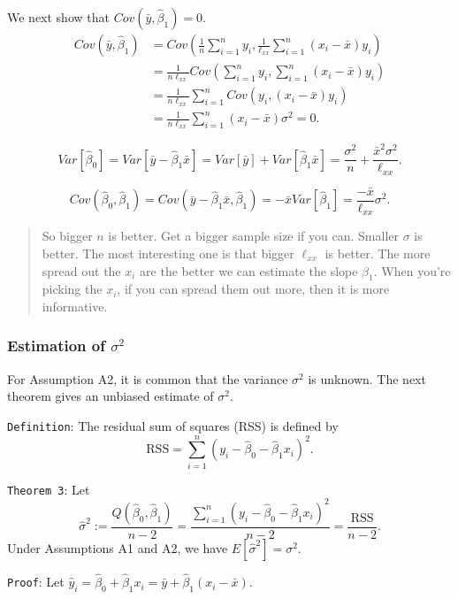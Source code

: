 \documentclass[]{article}
\begin{document}
We next show that \(Cov(\bar y,\hat \beta_1)=0\). \[
\begin{align}
Cov(\bar y,\hat \beta_1) &= Cov\left(\frac{1}{n}\sum_{i=1}^n y_i,\frac{1}{\ell_{xx}}\sum_{i=1}^n(x_i-\bar x)y_i\right)\\
&=\frac{1}{n\ell_{xx}}Cov\left(\sum_{i=1}^n y_i,\sum_{i=1}^n(x_i-\bar x)y_i\right)\\
&=\frac{1}{n\ell_{xx}}\sum_{i=1}^nCov(y_i,(x_i-\bar x)y_i)\\
&=\frac{1}{n\ell_{xx}}\sum_{i=1}^n(x_i-\bar x)\sigma^2 = 0.
\end{align}
\]

\[Var[\hat\beta_0] = Var[\bar y-\hat\beta_1\bar x]=Var[\bar y]+Var[\hat \beta_1\bar x]=\frac{\sigma^2}{n}+\frac{\bar x^2\sigma^2}{\ell_{xx}}.\]

\[Cov(\hat\beta_0,\hat\beta_1) = Cov(\bar y-\hat\beta_1\bar x,\hat\beta_1) = -\bar x Var[\hat\beta_1]=\frac{-\bar x}{\ell_{xx}}\sigma^2.\]

\begin{quote}
So bigger \(n\) is better. Get a bigger sample size if you can. Smaller
\(\sigma\) is better. The most interesting one is that bigger
\(\ell_{xx}\) is better. The more spread out the \(x_i\) are the better
we can estimate the slope \(\beta_1\). When you're picking the \(x_i\),
if you can spread them out more, then it is more informative.
\end{quote}

\hypertarget{estimation-of-sigma2}{%
\subsubsection{\texorpdfstring{Estimation of
\(\sigma^2\)}{Estimation of \textbackslash{}sigma\^{}2}}\label{estimation-of-sigma2}}

For Assumption A2, it is common that the variance \(\sigma^2\) is
unknown. The next theorem gives an unbiased estimate of \(\sigma^2\).

\texttt{Definition}: The residual sum of squares (RSS) is defined by
\[\mathrm{RSS} = \sum_{i=1}^n(y_i-\hat\beta_0-\hat\beta_1x_i)^2.\]

\texttt{Theorem\ 3}: Let
\[\hat{\sigma}^2 := \frac{Q(\hat \beta_0,\hat\beta_1)}{n-2}=\frac{\sum_{i=1}^n(y_i-\hat\beta_0-\hat\beta_1x_i)^2}{n-2}=\frac{\mathrm{RSS}}{n-2}.\]
Under Assumptions A1 and A2, we have \(E[\hat\sigma^2]=\sigma^2\).

\texttt{Proof}: Let
\(\hat y_i = \hat\beta_0+\hat\beta_1x_i=\bar y+\hat\beta_1(x_i-\bar x)\).
\end{document}
